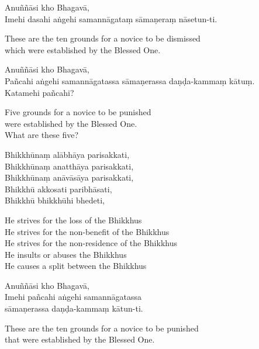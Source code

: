 Anuññāsi kho Bhagavā,\\
Imehi dasahi aṅgehi samannāgataṃ sāmaṇeraṃ nāsetun-ti.

\begin{english}
  These are the ten grounds for a novice to be dismissed\\
  which were established by the Blessed One.
\end{english}

Anuññāsi kho Bhagavā,\\
Pañcahi aṅgehi samannāgatassa sāmaṇerassa daṇḍa-kammaṃ kātuṃ.\\
Katamehi pañcahi?

\begin{english}
  Five grounds for a novice to be punished\\
  were established by the Blessed One.\\
  What are these five?
\end{english}

Bhikkhūnaṃ alābhāya parisakkati,\\
Bhikkhūnaṃ anatthāya parisakkati,\\
Bhikkhūnaṃ anāvāsāya parisakkati,\\
Bhikkhū akkosati paribhāsati,\\
Bhikkhū bhikkhūhi bhedeti,

\begin{english}
  He strives for the loss of the Bhikkhus\\
  He strives for the non-benefit of the Bhikkhus\\
  He strives for the non-residence of the Bhikkhus\\
  He insults or abuses the Bhikkhus\\
  He causes a split between the Bhikkhus
\end{english}

Anuññāsi kho Bhagavā,\\
Imehi pañcahi aṅgehi samannāgatassa\\
sāmaṇerassa daṇḍa-kammaṃ kātun-ti.

\begin{english}
  These are the ten grounds for a novice to be punished\\
  that were established by the Blessed One.
\end{english}

